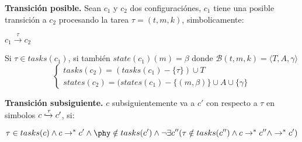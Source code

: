 \documentclass{beamer}
\begin{document}
\begin{frame}

  \textbf{Transición posible.} Sean $c_1$ y $c_2$ dos configuraciónes, $c_1$ tiene una posible transición a $c_2$ procesando la tarea $\tau = (t,m,k)$, simbolicamente:

  \begin{center}
    $c_1 \xrightarrow{\tau} c_2$
  \end{center}

  Si $\tau \in tasks(c_1)$, si también $state(c_1)(m) = \beta$ donde
  $\mathcal{B}(t,m,k) = \langle T,A,\gamma \rangle$ \\

  \[
  \begin{cases}
    tasks(c_2) = (tasks(c_1) - \{ \tau \} ) \cup T \\
    states(c_2) = (states(c_1) - \{ (m, \beta) \} \cup A \cup \{ \gamma \}
  \end{cases}
  \]
  
\end{frame}

\begin{frame}

  \textbf{Transición subsiguiente.}  $c$ subsiguientemente va a $c'$ con respecto a $\tau$ en simbolos $c \xhookrightarrow{\tau} c'$, si:

  \[
  \tau \in tasks(c) \land c \rightarrow^* c' \land \phy \notin tasks(c') \land \\
  \neg \exists c'' (\tau \notin tasks(c'') \land c \rightarrow^* c'' \land \rightarrow^* c') 
  \]
    
\end{frame}
\end{document}

